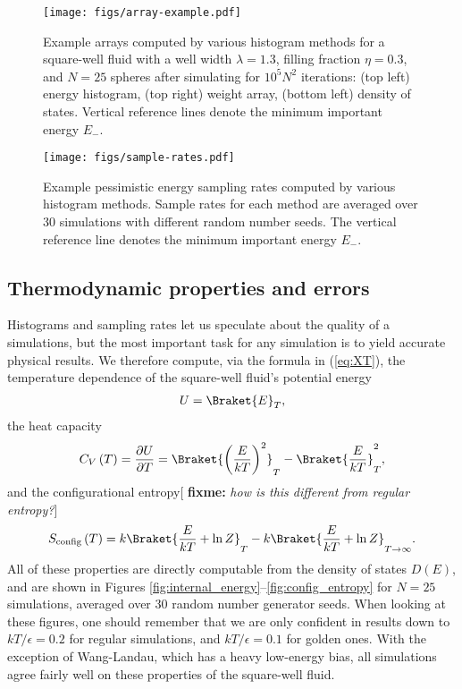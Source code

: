 \documentclass[11pt]{article}
\newcommand{\bk}{\Braket} %
\renewcommand{\t}{\text} %
\newcommand{\f}[2]{\dfrac{#1}{#2}} %
\newcommand{\p}[1]{\left(#1\right)} %
\newcommand{\red}[1]{{\bf \color{red} #1}}
\newcommand{\fixme}[1]{[\red{fixme:} \emph{#1}]}
\begin{document}
\begin{figure}
  \centering
  \texttt{[image: figs/array-example.pdf]}
  \caption[Example arrays]
  {Example arrays computed by various histogram methods for a
    square-well fluid with a well width $\lambda=1.3$, filling
    fraction $\eta=0.3$, and $N=25$ spheres after simulating for
    $10^5N^2$ iterations: (top left) energy histogram, (top right)
    weight array, (bottom left) density of states. Vertical reference
    lines denote the minimum important energy $E_-$.}
  \label{fig:arrays}
\end{figure}

\begin{figure}
  \centering
  \texttt{[image: figs/sample-rates.pdf]}
  \caption[Example energy sampling rates]
  {Example pessimistic energy sampling rates computed by various
    histogram methods. Sample rates for each method are averaged over
    30 simulations with different random number seeds. The vertical
    reference line denotes the minimum important energy $E_-$.}
  \label{fig:sample_rates}
\end{figure}

\subsection{Thermodynamic properties and errors}
\label{sec:properties}

Histograms and sampling rates let us speculate about the quality of a
simulations, but the most important task for any simulation is to
yield accurate physical results. We therefore compute, via the formula
in (\ref{eq:XT}), the temperature dependence of the square-well
fluid's potential energy
\begin{align}
  U=\bk{E}_T,
  \label{eq:U}
\end{align}
the heat capacity
\begin{align}
  C_V\p{T}=\f{\partial U}{\partial T}
  =\bk{\p{\f{E}{kT}}^2}_T-\bk{\f{E}{kT}}_T^2,
  \label{eq:CV}
\end{align}
and the configurational entropy\fixme{how is this different from
  regular entropy?}
\begin{align}
  S_{\t{config}}\p{T}=k\bk{\f{E}{kT}+\ln Z}_T
  -k\bk{\f{E}{kT}+\ln Z}_{T\to\infty}.
  \label{eq:S}
\end{align}
All of these properties are directly computable from the density of
states $D\p{E}$, and are shown in Figures
\ref{fig:internal_energy}--\ref{fig:config_entropy} for $N=25$
simulations, averaged over 30 random number generator seeds. When
looking at these figures, one should remember that we are only
confident in results down to $kT/\epsilon=0.2$ for regular
simulations, and $kT/\epsilon=0.1$ for golden ones. With the exception
of Wang-Landau, which has a heavy low-energy bias, all simulations
agree fairly well on these properties of the square-well fluid.
\end{document}
